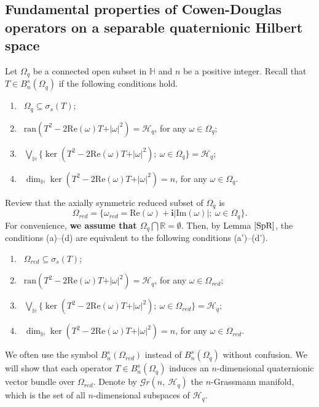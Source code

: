\documentclass[pdflatex,sn-mathphys-num]{sn-jnl}%
\theoremstyle{thmstyleone}%
\theoremstyle{thmstyletwo}%
\theoremstyle{thmstylethree}%
\theoremstyle{definition}
\theoremstyle{remark}
\begin{document}
\subsection{Fundamental properties of Cowen-Douglas operators on a separable quaternionic Hilbert space}

Let $\Omega_q$ be a connected open subset in $\mathbb{H}$ and  $n$ be a positive integer. Recall that  $T\in B_n^{s}(\Omega_q)$ if the following conditions hold.
\begin{enumerate}
\item[(a)] \ $\Omega_q\subseteq\sigma_{s}(T)$; \\
\item[(b)] \ $\mathrm{ran}(T^2-2\mathrm{Re}(\omega) T+\vert\omega \vert^2)=\mathcal{H}_q$, for any $\omega\in\Omega_q$;\\
\item[(c)] \ $\bigvee_{\mathbb{H}} \{\ker(T^2-2\mathrm{Re}(\omega) T+\vert\omega \vert^2);\ \omega\in\Omega_q\}=\mathcal{H}_q$;\\
\item[(d)] \ $\dim_{\mathbb{H}} \ker(T^2-2\mathrm{Re}(\omega)T+\vert\omega \vert^2)=n$, for any $\omega\in\Omega_q$.
\end{enumerate}

Review that  the axially symmetric reduced subset of $\Omega_q$ is
\[\Omega_{red}=\{\omega_{red}=\mathrm{Re}(\omega)+\boldsymbol{i}|\mathrm{Im}(\omega)|;\ \omega\in\Omega_q\}.
\]
For convenience, {\bf we assume that $\Omega_q\bigcap\mathbb{R}=\emptyset$}. Then, by Lemma $\ref{SpR}$, the conditions (a)--(d) are equivalent to the following conditions (a')--(d').
\begin{enumerate}
	\item[(a')] \ $\Omega_{red}\subseteq\sigma_{s}(T)$; \\
	\item[(b')] \ $\mathrm{ran}(T^2-2\mathrm{Re}(\omega) T+\vert\omega \vert^2)=\mathcal{H}_q$, for any $\omega\in\Omega_{red}$;\\
	\item[(c')] \ $\bigvee_{\mathbb{H}} \{\ker(T^2-2\mathrm{Re}(\omega) T+\vert\omega \vert^2);\ \omega\in\Omega_{red}\}=\mathcal{H}_q$;\\
	\item[(d')] \ $\dim_{\mathbb{H}} \ker(T^2-2\mathrm{Re}(\omega)T+\vert\omega \vert^2)=n$, for any $\omega\in\Omega_{red}$.
\end{enumerate}
We often use the symbol $B_n^{s}(\Omega_{red})$ instead of $B_n^{s}(\Omega_q)$ without confusion.
We will show that each operator $T\in B_n^{s}(\Omega_q)$ induces an $n$-dimensional quaternionic vector bundle over $\Omega_{red}$. Denote by $\mathcal{G}r(n,\ \mathcal{H}_q)$  the $n$-Grassmann manifold, which is the set of all $n$-dimensional subspaces of $\mathcal{H}_q$.
\end{document}
